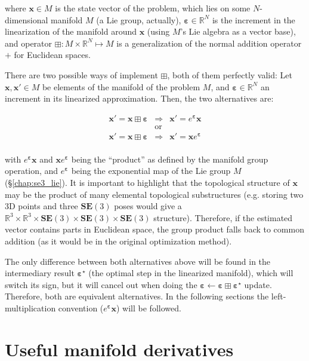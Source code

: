 \documentclass[a4paper,11pt]{report}
\newcommand{\E}{{\bm{\varepsilon}}}
\begin{document}
\noindent where $\mathbf{x} \in M$ is the state vector of the problem, which lies 
on some $N$-dimensional manifold $M$ (a Lie group, actually), 
$\E \in \mathbb{R}^N$ is the increment in the linearization of the manifold 
around $\mathbf{x}$ (using $M$'s Lie algebra as a vector base),
and operator $\boxplus: M \times \mathbb{R}^N \mapsto M$
is a generalization of the normal addition operator $+$ for Euclidean spaces.

There are two possible ways of implement $\boxplus$, both of them perfectly valid:
Let $\mathbf{x}, \mathbf{x}' \in M$ be elements of the manifold of the problem $M$, 
and $\E \in \mathbb{R}^N$ an increment in its linearized approximation.
Then, the two alternatives are:

\begin{eqnarray}
 \mathbf{x}' = \mathbf{x} \boxplus \E  & \Longrightarrow  & \mathbf{x}' = e^\E \mathbf{x}  \\
 & \text{or} & \\
 \mathbf{x}' = \mathbf{x} \boxplus \E  & \Longrightarrow & \mathbf{x}' = \mathbf{x} e^\E  \\
\end{eqnarray}

\noindent with $e^\E \mathbf{x}$ and $\mathbf{x} e^\E$ being the ``product'' as defined by 
the manifold group operation, and $e^\E$ being the exponential map of the Lie group $M$
(\S\ref{chap:se3_lie}). 
It is important to highlight that the topological structure of 
$\mathbf{x}$ may be the product of many elemental topological substructures 
(e.g. storing two 3D points and three $\mathbf{SE}(3)$ poses would give a 
$\mathbb{R}^3 \times \mathbb{R}^3 \times \mathbf{SE}(3) \times \mathbf{SE}(3) \times \mathbf{SE}(3)$
structure). Therefore, if the estimated vector contains parts in Euclidean space, the 
group product falls back to common addition 
(as it would be in the original optimization method).

The only difference between both alternatives above
will be found in the intermediary result $\E^\star$ 
(the optimal step in the linearized manifold), 
which will switch its sign, but it will cancel out 
when doing the $\E \leftarrow \E \boxplus \E^\star$ update. 
Therefore, both are equivalent alternatives.
In the following sections the left-multiplication convention ($e^\E \mathbf{x}$) 
will be followed.


\section{Useful manifold derivatives}
\label{chap:se3_lie:deriv}
\end{document}
